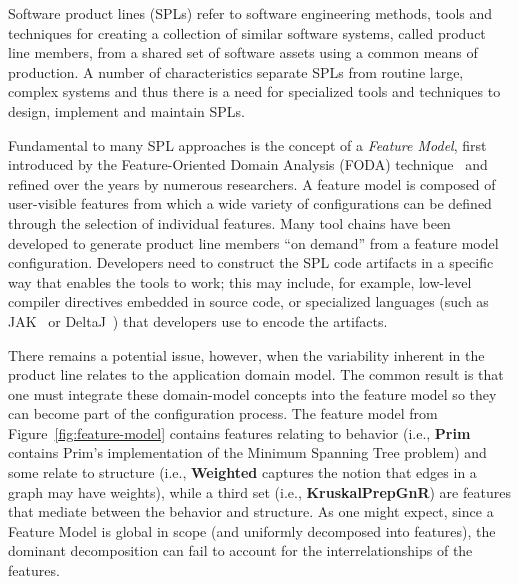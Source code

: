 
Software product lines (SPLs) refer to software engineering methods,
tools and techniques for creating a collection of similar software
systems, called product line members, from a shared set of software
assets using a common means of production. A number of characteristics
separate SPLs from routine large, complex systems and thus there is a
need for specialized tools and techniques to design, implement and
maintain SPLs.

Fundamental to many SPL approaches is the concept of a \textit{Feature
Model}, first introduced by the Feature-Oriented Domain Analysis (FODA)
technique~\cite{Kang1990} and refined over the years by numerous
researchers. A feature model is composed of user-visible features from
which a wide variety of configurations can be defined through the
selection of individual features. Many tool chains have been developed
to generate product line members ``on demand'' from a feature model
configuration. Developers need to construct the SPL code artifacts in a
specific way that enables the tools to work; this may include, for
example, low-level compiler directives embedded in source code, or
specialized languages (such as JAK~\cite{Batory2004FeatureorientedPA} or
DeltaJ~\cite{Schaefer:2010:DPS:1885639.1885647}) that developers use to
encode the artifacts.


There remains a potential issue, however, when the variability inherent
in the product line relates to the application domain model. The common
result is that one must integrate these domain-model concepts into the
feature model so they can become part of the configuration process. The
feature model from Figure~\ref{fig:feature-model} contains features
relating to behavior (i.e., \textbf{Prim} contains Prim's implementation
of the Minimum Spanning Tree problem) and some relate to structure
(i.e., \textbf{Weighted} captures the notion that edges in a graph may
have weights), while a third set (i.e., \textbf{KruskalPrepGnR}) are
features that mediate between the behavior and structure. As one might
expect, since a Feature Model is global in scope (and uniformly
decomposed into features), the dominant decomposition can fail to
account for the interrelationships of the features.

